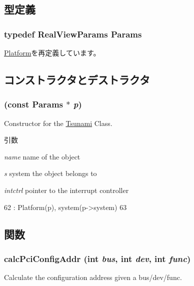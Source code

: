 \subsection{型定義}
\hypertarget{classRealView_aa902b300d4e5553ea4f127d69fc0fa3a}{
\subsubsection[{Params}]{\setlength{\rightskip}{0pt plus 5cm}typedef RealViewParams {\bf Params}}}
\label{classRealView_aa902b300d4e5553ea4f127d69fc0fa3a}


\hyperlink{classPlatform_af4e77eaf2602e4808deef7d1ba95e579}{Platform}を再定義しています。

\subsection{コンストラクタとデストラクタ}
\hypertarget{classRealView_a6a5205c4e13fbe18abbcd12f6eea2c66}{
\subsubsection[{RealView}]{ (const {\bf Params} $\ast$ {\em p})}}
\label{classRealView_a6a5205c4e13fbe18abbcd12f6eea2c66}
Constructor for the \hyperlink{classTsunami}{Tsunami} Class. 
\begin{DoxyParams}{引数}
\item[{\em name}]name of the object \item[{\em s}]system the object belongs to \item[{\em intctrl}]pointer to the interrupt controller \end{DoxyParams}



\begin{DoxyCode}
62     : Platform(p), system(p->system)
63 {}
\end{DoxyCode}


\subsection{関数}
\hypertarget{classRealView_a5b8797a83289cb5fd895c9a5dc7eae6f}{
\subsubsection[{calcPciConfigAddr}]{ calcPciConfigAddr (int {\em bus}, \/  int {\em dev}, \/  int {\em func})}}
\label{classRealView_a5b8797a83289cb5fd895c9a5dc7eae6f}
Calculate the configuration address given a bus/dev/func. 

